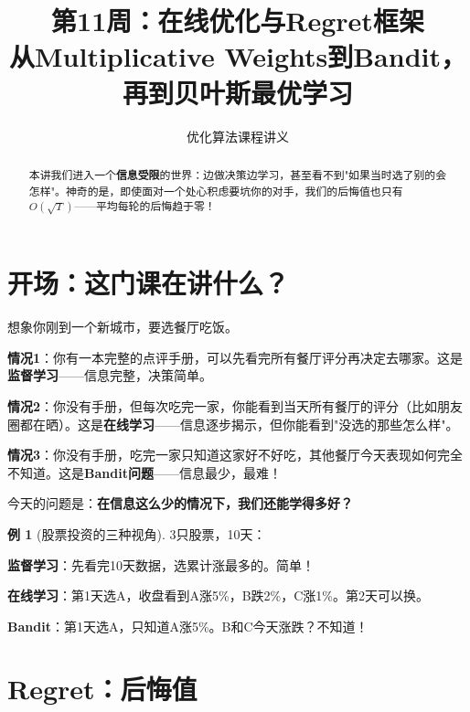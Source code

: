 \documentclass[11pt,a4paper]{article}
\title{\textbf{第11周：在线优化与Regret框架} \\[0.5em]
\large 从Multiplicative Weights到Bandit，再到贝叶斯最优学习}
\author{优化算法课程讲义}
\date{}
\theoremstyle{definition}
\newtheorem{example}{例}[section]
\begin{document}
\maketitle

\begin{abstract}
本讲我们进入一个\textbf{信息受限}的世界：边做决策边学习，甚至看不到"如果当时选了别的会怎样"。神奇的是，即使面对一个处心积虑要坑你的对手，我们的后悔值也只有$O(\sqrt{T})$——平均每轮的后悔趋于零！
\end{abstract}

\tableofcontents
\newpage

\section{开场：这门课在讲什么？}

\begin{plainwords}
想象你刚到一个新城市，要选餐厅吃饭。

\textbf{情况1}：你有一本完整的点评手册，可以先看完所有餐厅评分再决定去哪家。这是\textbf{监督学习}——信息完整，决策简单。

\textbf{情况2}：你没有手册，但每次吃完一家，你能看到当天所有餐厅的评分（比如朋友圈都在晒）。这是\textbf{在线学习}——信息逐步揭示，但你能看到"没选的那些怎么样"。

\textbf{情况3}：你没有手册，吃完一家只知道这家好不好吃，其他餐厅今天表现如何完全不知道。这是\textbf{Bandit问题}——信息最少，最难！

今天的问题是：\textbf{在信息这么少的情况下，我们还能学得多好？}
\end{plainwords}

\begin{example}[股票投资的三种视角]
3只股票，10天：

\textbf{监督学习}：先看完10天数据，选累计涨最多的。简单！

\textbf{在线学习}：第1天选A，收盘看到A涨5\%，B跌2\%，C涨1\%。第2天可以换。

\textbf{Bandit}：第1天选A，只知道A涨5\%。B和C今天涨跌？不知道！
\end{example}

\section{Regret：后悔值}
\end{document}
